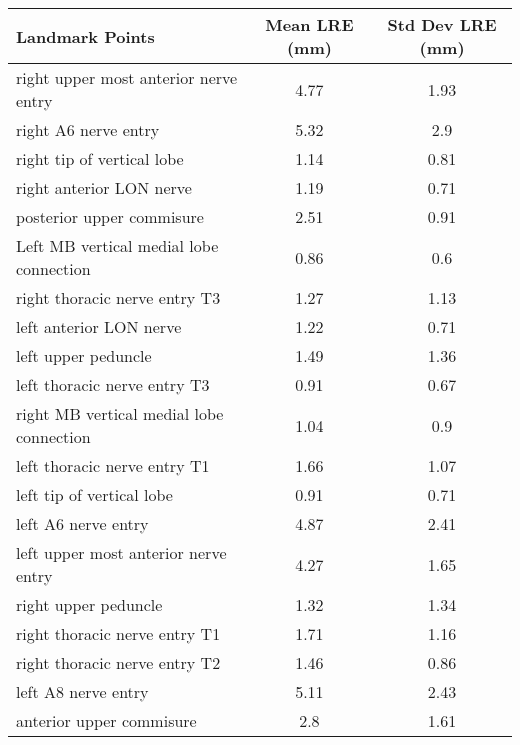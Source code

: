 \begin{tabular}{lcc}
\hline
 ﻿Landmark Points                            & Mean LRE (mm) & Std Dev LRE (mm) \\ \hline \hline
 right upper most anterior nerve entry       & 4.77          & 1.93             \\
 right A6 nerve entry                        & 5.32          & 2.9              \\
 right tip of vertical lobe                  & 1.14          & 0.81             \\
 right anterior LON nerve                    & 1.19          & 0.71             \\
 posterior upper commisure                   & 2.51          & 0.91             \\
 Left MB vertical medial lobe connection     & 0.86          & 0.6              \\
 right thoracic nerve entry T3               & 1.27          & 1.13             \\
 left anterior LON nerve                     & 1.22          & 0.71             \\
 left upper peduncle                         & 1.49          & 1.36             \\
 left thoracic nerve entry T3                & 0.91          & 0.67             \\
 right MB vertical medial lobe connection    & 1.04          & 0.9              \\
 left thoracic nerve entry T1                & 1.66          & 1.07             \\
 left tip of vertical lobe                   & 0.91          & 0.71             \\
 left A6 nerve entry                         & 4.87          & 2.41             \\
 left upper most anterior nerve entry        & 4.27          & 1.65             \\
 right upper peduncle                        & 1.32          & 1.34             \\
 right thoracic nerve entry T1               & 1.71          & 1.16             \\
 right thoracic nerve entry T2               & 1.46          & 0.86             \\
 left A8 nerve entry                         & 5.11          & 2.43             \\
 anterior upper commisure                    & 2.8           & 1.61             \\

\end{tabular}
